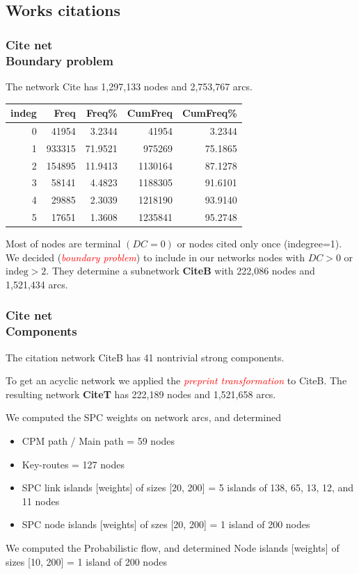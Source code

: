 \documentclass[hyperref={pdfstartview={FitBH -32768},
                         pdfpagemode=FullScreen,
                         plainpages=false,
                         colorlinks=true}
              ]{beamer}
\newcommand{\keyw}[1]{\textcolor{red}{\emph{#1}}}
\newcommand{\indeg}{\mbox{indeg}}
\begin{document}
\subsection{Works citations}  
\begin{frame}[fragile]
\frametitle{Cite net \\ \normalsize Boundary problem}
\small 

The network Cite has 1,297,133  nodes and 2,753,767 arcs.
\medskip

\footnotesize
\begin{center}
\begin{tabular}{|r|r|r|r|r|}
 indeg &       Freq &    Freq\%  &  CumFreq &  CumFreq\% \\ \hline
 0     & 41954   &  3.2344     & 41954   &  3.2344  \\ 
1   &  933315  &  71.9521   &  975269  & 75.1865  \\
2   &  154895   & 11.9413   & 1130164  &  87.1278 \\ \hline
3   &  58141    & 4.4823   & 1188305   & 91.6101  \\ 
4   &  29885   & 2.3039  & 1218190  & 93.9140 \\  
5   &  17651   & 1.3608   & 1235841  & 95.2748  \\ \hline
\end{tabular}
\end{center}

\medskip

Most of nodes are terminal $(DC=0)$ or nodes cited only once (indegree=1). We decided (\keyw{boundary problem}) to include in our networks nodes with $DC > 0$ or $\indeg > 2$. They determine a subnetwork \textbf{CiteB} with  222,086 nodes and 1,521,434 arcs.

\end{frame}

\begin{frame}[fragile]
\frametitle{Cite net \\ \normalsize Components}
\small
The citation network CiteB has 41 nontrivial strong components.
 
To get an acyclic network we applied the \keyw{preprint transformation} to CiteB. The resulting network \textbf{CiteT} has 222,189 nodes and 1,521,658 arcs. 

We computed the SPC weights on network arcs, and determined 
\begin{itemize}
\item CPM path / Main path = 59 nodes
\item Key-routes = 127 nodes  
\item SPC link islands [weights] of sizes [20, 200] = 5 islands of 138, 65, 13, 12, and 11 nodes  
\item SPC node islands [weights] of szes [20, 200] = 1 island of 200 nodes 
\end{itemize}
We computed the Probabilistic flow, and determined Node islands [weights] of sizes [10, 200] = 1 island of 200 nodes

\end{frame}
\end{document}
